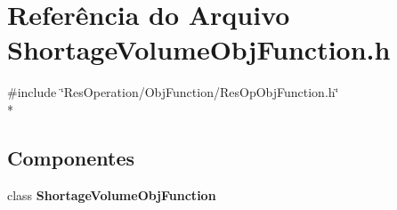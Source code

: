 \section{Referência do Arquivo Shortage\+Volume\+Obj\+Function.\+h}
\label{_obj_function_2_shortage_volume_2_shortage_volume_obj_function_8h}
{\ttfamily \#include \char`\"{}Res\+Operation/\+Obj\+Function/\+Res\+Op\+Obj\+Function.\+h\char`\"{}}\\*
\subsection*{Componentes}
\begin{DoxyCompactItemize}
\item 
class {\bf Shortage\+Volume\+Obj\+Function}
\end{DoxyCompactItemize}
